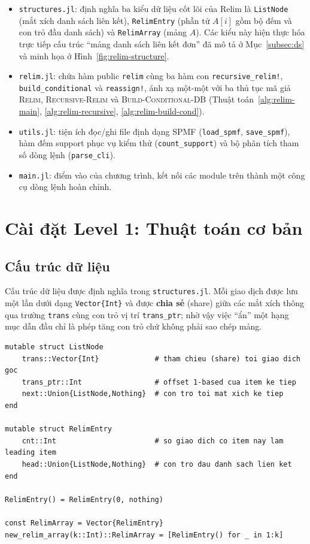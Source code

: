 \documentclass[12pt,a4paper]{report}
\begin{document}
\begin{itemize}
    \item \texttt{structures.jl}: định nghĩa ba kiểu dữ liệu cốt lõi của Relim
    là \texttt{ListNode} (mắt xích danh sách liên kết), \texttt{RelimEntry}
    (phần tử $A[i]$ gồm bộ đếm và con trỏ đầu danh sách) và \texttt{RelimArray}
    (mảng $A$). Các kiểu này hiện thực hóa trực tiếp cấu trúc ``mảng danh sách
    liên kết đơn'' đã mô tả ở Mục~\ref{subsec:ds} và minh họa ở
    Hình~\ref{fig:relim-structure}.

    \item \texttt{relim.jl}: chứa hàm public \texttt{relim} cùng ba hàm con
    \texttt{recursive\_relim!}, \texttt{build\_conditional} và
    \texttt{reassign!}, ánh xạ một-một với ba thủ tục mã giả
    \textsc{Relim}, \textsc{Recursive-Relim} và \textsc{Build-Conditional-DB}
    (Thuật toán~\ref{alg:relim-main}, \ref{alg:relim-recursive},
    \ref{alg:relim-build-cond}).

    \item \texttt{utils.jl}: tiện ích đọc/ghi file định dạng SPMF
    (\texttt{load\_spmf}, \texttt{save\_spmf}), hàm đếm support phục vụ kiểm thử
    (\texttt{count\_support}) và bộ phân tích tham số dòng lệnh
    (\texttt{parse\_cli}).

    \item \texttt{main.jl}: điểm vào của chương trình, kết nối các module trên
    thành một công cụ dòng lệnh hoàn chỉnh.
\end{itemize}

\section{Cài đặt Level 1: Thuật toán cơ bản}


\subsection{Cấu trúc dữ liệu}

Cấu trúc dữ liệu được định nghĩa trong \texttt{structures.jl}. Mỗi giao dịch
được lưu một lần dưới dạng \texttt{Vector\{Int\}} và được \textbf{chia sẻ} (share)
giữa các mắt xích thông qua trường \texttt{trans} cùng con trỏ vị trí
\texttt{trans\_ptr}; nhờ vậy việc ``ẩn'' một hạng mục dẫn đầu chỉ là phép tăng
con trỏ chứ không phải sao chép mảng.

\begin{lstlisting}[style=julia, caption={Định nghĩa cấu trúc dữ liệu (structures.jl)},
                   label={lst:structures}]
mutable struct ListNode
    trans::Vector{Int}             # tham chieu (share) toi giao dich goc
    trans_ptr::Int                 # offset 1-based cua item ke tiep
    next::Union{ListNode,Nothing}  # con tro toi mat xich ke tiep
end

mutable struct RelimEntry
    cnt::Int                       # so giao dich co item nay lam leading item
    head::Union{ListNode,Nothing}  # con tro dau danh sach lien ket
end

RelimEntry() = RelimEntry(0, nothing)

const RelimArray = Vector{RelimEntry}
new_relim_array(k::Int)::RelimArray = [RelimEntry() for _ in 1:k]
\end{lstlisting}
\end{document}

